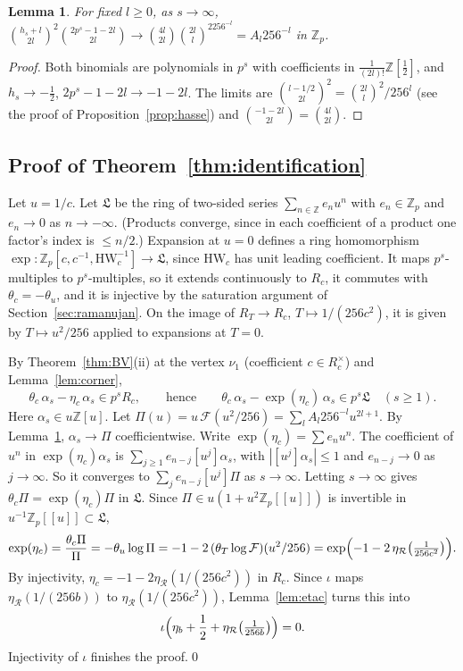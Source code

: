 \documentclass[11pt]{amsart}
\newtheorem{lemma}[theorem]{Lemma}
\theoremstyle{definition}
\theoremstyle{remark}
\newcommand{\Z}{\mathbb{Z}}
\newcommand{\Zp}{\mathbb{Z}_p}
\newcommand{\cF}{\mathcal{F}}
\newcommand{\cL}{\mathfrak{L}}
\begin{document}
\begin{lemma}\label{lem:limit}
For fixed $l\ge0$, as $s\to\infty$,
$\binom{h_s+l}{2l}^2\binom{2p^s-1-2l}{2l}\to\binom{4l}{2l}\binom{2l}l^2256^{-l}=A_l256^{-l}$ in $\Zp$.
\end{lemma}
\begin{proof}
Both binomials are polynomials in $p^s$ with coefficients in $\frac1{(2l)!}\Z[\frac12]$, and
$h_s\to-\frac12$, $2p^s-1-2l\to-1-2l$. The limits are
$\binom{l-1/2}{2l}^2=\binom{2l}l^2/256^l$ (see the proof of Proposition~\ref{prop:hasse}) and
$\binom{-1-2l}{2l}=\binom{4l}{2l}$.
\end{proof}

\subsection{Proof of Theorem~\ref{thm:identification}}
Let $u=1/c$. Let $\cL$ be the ring of two-sided series $\sum_{n\in\Z}e_nu^n$ with $e_n\in\Zp$ and
$e_n\to0$ as $n\to-\infty$. (Products converge, since in each coefficient of a product one
factor's index is $\le n/2$.) Expansion at $u=0$ defines a ring homomorphism
$\exp:\Zp[c,c^{-1},\mathrm{HW}_c^{-1}]\to\cL$, since $\mathrm{HW}_c$ has unit leading coefficient. It
maps $p^s$-multiples to $p^s$-multiples, so it extends continuously to $R_c$, it commutes with
$\theta_c=-\theta_u$, and it is injective by the saturation argument of
Section~\ref{sec:ramanujan}. On the image of $R_T\to R_c$, $T\mapsto1/(256c^2)$, it is given by
$T\mapsto u^2/256$ applied to expansions at $T=0$.

By Theorem~\ref{thm:BV}(ii) at the vertex $\nu_1$ (coefficient $c\in R_c^\times$) and
Lemma~\ref{lem:corner},
\[
 \theta_c\,\alpha_s-\eta_c\,\alpha_s\in p^sR_c,\qquad\text{hence}\qquad
 \theta_c\,\alpha_s-\exp(\eta_c)\,\alpha_s\in p^s\cL\quad(s\ge1).
\]
Here $\alpha_s\in u\Z[u]$. Let $\Pi(u)=u\,\cF(u^2/256)=\sum_lA_l256^{-l}u^{2l+1}$. By
Lemma~\ref{lem:limit}, $\alpha_s\to\Pi$ coefficientwise. Write $\exp(\eta_c)=\sum e_nu^n$. The
coefficient of $u^n$ in $\exp(\eta_c)\alpha_s$ is $\sum_{j\ge1}e_{n-j}[u^j]\alpha_s$, with
$|[u^j]\alpha_s|\le1$ and $e_{n-j}\to0$ as $j\to\infty$. So it converges to
$\sum_je_{n-j}[u^j]\Pi$ as $s\to\infty$. Letting $s\to\infty$ gives
$\theta_c\Pi=\exp(\eta_c)\Pi$ in $\cL$. Since $\Pi\in u(1+u^2\Zp[[u]])$ is invertible in
$u^{-1}\Zp[[u]]\subset\cL$,
\[
 \exp(\eta_c)=\frac{\theta_c\Pi}\Pi=-\theta_u\log\Pi=-1-2\,(\theta_T\log\cF)(u^2/256)
 =\exp\Bigl(-1-2\,\eta_{\mathcal R}\bigl(\tfrac1{256c^2}\bigr)\Bigr).
\]
By injectivity, $\eta_c=-1-2\eta_{\mathcal R}(1/(256c^2))$ in $R_c$. Since
$\iota$ maps $\eta_{\mathcal R}(1/(256b))$ to $\eta_{\mathcal R}(1/(256c^2))$, Lemma~\ref{lem:etac}
turns this into
\[
 \iota\Bigl(\eta_b+\frac12+\eta_{\mathcal R}\bigl(\tfrac1{256b}\bigr)\Bigr)=0 .
\]
Injectivity of $\iota$ finishes the proof.\qed
\end{document}
